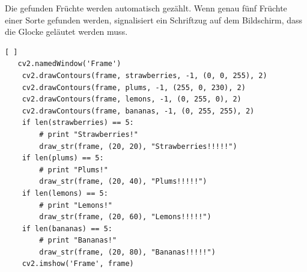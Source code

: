 Die gefunden Früchte werden automatisch gezählt. Wenn genau fünf Früchte einer Sorte gefunden werden, signalisiert ein Schriftzug auf dem Bildschirm, dass die Glocke geläutet werden muss. 

\lstset{language=Python}
\begin{lstlisting}[ ]
   cv2.namedWindow('Frame')
    cv2.drawContours(frame, strawberries, -1, (0, 0, 255), 2)
    cv2.drawContours(frame, plums, -1, (255, 0, 230), 2)
    cv2.drawContours(frame, lemons, -1, (0, 255, 0), 2)
    cv2.drawContours(frame, bananas, -1, (0, 255, 255), 2)
    if len(strawberries) == 5:
        # print "Strawberries!"
        draw_str(frame, (20, 20), "Strawberries!!!!!")
    if len(plums) == 5:
        # print "Plums!"
        draw_str(frame, (20, 40), "Plums!!!!!")
    if len(lemons) == 5:
        # print "Lemons!"
        draw_str(frame, (20, 60), "Lemons!!!!!")
    if len(bananas) == 5:
        # print "Bananas!"
        draw_str(frame, (20, 80), "Bananas!!!!!")
    cv2.imshow('Frame', frame)
\end{lstlisting}



